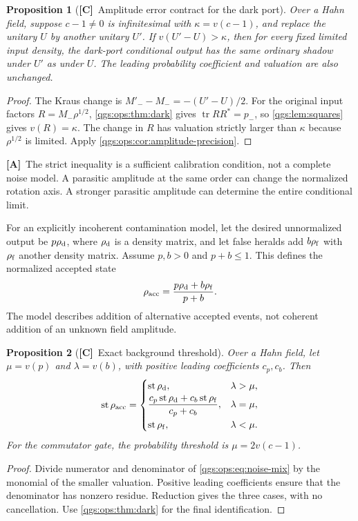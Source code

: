 \documentclass[11pt,oneside]{article}
\numberwithin{equation}{section}
\theoremstyle{plain}
\newtheorem{proposition}[proposition]{Proposition}
\theoremstyle{definition}
\theoremstyle{remark}
\DeclareMathOperator{\st}{st}
\DeclareMathOperator{\tr}{tr}
\newcommand{\TC}{\textcolor{TierC}{\textsf{\bfseries[C]}}}
\newcommand{\TA}{\textcolor{TierA}{\textsf{\bfseries[A]}}}
\begin{document}
\begin{proposition}[\TC\ Amplitude error contract for the dark port]\label{qgs:ops:prop:gate-precision}
Over a Hahn field, suppose $c-1\ne0$ is infinitesimal with $\kappa=v(c-1)$, and replace the unitary $U$ by another unitary $U'$. If $v(U'-U)>\kappa$, then for every fixed limited input density, the dark-port conditional output has the same ordinary shadow under $U'$ as under $U$. The leading probability coefficient and valuation are also unchanged.
\end{proposition}
\begin{proof}
The Kraus change is $M'_--M_-=-(U'-U)/2$. For the original input factors $R=M_-\rho^{1/2}$, \cref{qgs:ops:thm:dark} gives $\tr RR^*=p_-$, so \cref{qgs:lem:squares} gives $v(R)=\kappa$. The change in $R$ has valuation strictly larger than $\kappa$ because $\rho^{1/2}$ is limited. Apply \cref{qgs:ops:cor:amplitude-precision}.
\end{proof}

\TA\ The strict inequality is a sufficient calibration condition, not a complete noise model. A parasitic amplitude at the same order can change the normalized rotation axis. A stronger parasitic amplitude can determine the entire conditional limit.

For an explicitly incoherent contamination model, let the desired unnormalized output be $p\rho_{\rm d}$, where $\rho_{\rm d}$ is a density matrix, and let false heralds add $b\rho_{\rm f}$ with $\rho_{\rm f}$ another density matrix. Assume $p,b>0$ and $p+b\le1$. This defines the normalized accepted state
\begin{equation}\label{qgs:ops:eq:noise-mix}
 \rho_{\rm acc}=\frac{p\rho_{\rm d}+b\rho_{\rm f}}{p+b}.
\end{equation}
The model describes addition of alternative accepted events, not coherent addition of an unknown field amplitude.

\begin{proposition}[\TC\ Exact background threshold]\label{qgs:ops:prop:background}
Over a Hahn field, let $\mu=v(p)$ and $\lambda=v(b)$, with positive leading coefficients $c_p,c_b$. Then
\begin{equation}\label{qgs:ops:eq:background-cases}
 \st\rho_{\rm acc}=
 \begin{cases}
  \st\rho_{\rm d},&\lambda>\mu,\\[2pt]
  \dfrac{c_p\st\rho_{\rm d}+c_b\st\rho_{\rm f}}{c_p+c_b},&\lambda=\mu,\\[7pt]
  \st\rho_{\rm f},&\lambda<\mu.
 \end{cases}
\end{equation}
For the commutator gate, the probability threshold is $\mu=2v(c-1)$.
\end{proposition}
\begin{proof}
Divide numerator and denominator of \eqref{qgs:ops:eq:noise-mix} by the monomial of the smaller valuation. Positive leading coefficients ensure that the denominator has nonzero residue. Reduction gives the three cases, with no cancellation. Use \cref{qgs:ops:thm:dark} for the final identification.
\end{proof}
\end{document}
